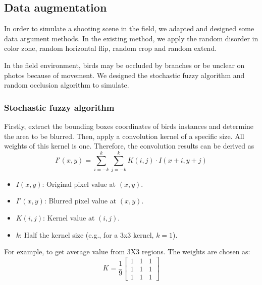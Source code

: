 \subsection{Data augmentation}
In order to simulate a shooting scene in the field, 
we adapted and designed some data argument methods. 
In the existing method, we apply the random disorder 
in color zone, random horizontal flip, 
random crop and random extend.

In the field environment, birds may be occluded by 
branches or be unclear on photos because of movement. 
We designed the stochastic fuzzy algorithm and 
random occlusion algorithm to simulate. 
\subsubsection{Stochastic fuzzy algorithm}
Firstly, extract the bounding boxes coordinates of 
birds instances and determine the area to be blurred. 
Then, apply a convolution kernel of a specific size. 
All weights of this kernel is one. Therefore, the 
convolution results can be derived as 
\[
I'(x, y) = \sum_{i=-k}^{k} \sum_{j=-k}^{k} K(i, j) \cdot I(x+i, y+j)
\]
\begin{itemize}
    \item \( I(x, y) \): Original pixel value at \((x, y)\).
    \item \( I'(x, y) \): Blurred pixel value at \((x, y)\).
    \item \( K(i, j) \): Kernel value at \((i, j)\).
    \item \( k \): Half the kernel size (e.g., for a 3x3 kernel, \( k=1 \)).
\end{itemize}
For example, to get average value from 3X3 regions.
The weights are chosen as:
\[
K = \frac{1}{9}
\begin{bmatrix}
1 & 1 & 1 \\
1 & 1 & 1 \\
1 & 1 & 1
\end{bmatrix}
\]
